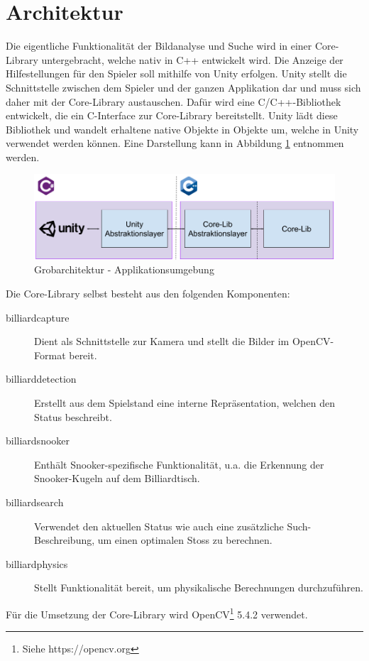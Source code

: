 \section{Architektur}\label{sec:architecture}

Die eigentliche Funktionalität der Bildanalyse und Suche wird in einer Core-Library untergebracht, welche nativ in C++ entwickelt wird.
Die Anzeige der Hilfestellungen für den Spieler soll mithilfe von Unity erfolgen. Unity stellt die Schnittstelle zwischen
dem Spieler und der ganzen Applikation dar und muss sich daher mit der Core-Library austauschen.
Dafür wird eine C/C++-Bibliothek entwickelt, die ein C-Interface zur Core-Library bereitstellt.
Unity lädt diese Bibliothek und wandelt erhaltene native Objekte in Objekte um, welche in Unity verwendet werden können.
Eine Darstellung kann in Abbildung \ref{fig:top-level-architecture} entnommen werden.

\begin{figure}[h!]
    \begin{center}
        \includegraphics[width=0.8\linewidth]{../common/03_billiard_ai/resources/00_top_level_architecture.png}
    \end{center}
    \caption{Grobarchitektur - Applikationsumgebung}
    \label{fig:top-level-architecture}
\end{figure}

Die Core-Library selbst besteht aus den folgenden Komponenten:
\begin{description}
    \item[billiard\textunderscore capture] Dient als Schnittstelle zur Kamera und stellt die Bilder im OpenCV-Format bereit.
    \item[billiard\textunderscore detection] Erstellt aus dem Spielstand eine interne Repräsentation, welchen den Status beschreibt.
    \item[billiard\textunderscore snooker] Enthält Snooker-spezifische Funktionalität, u.a. die Erkennung der Snooker-Kugeln auf dem Billiardtisch.
    \item[billiard\textunderscore search] Verwendet den aktuellen Status wie auch eine zusätzliche Such-Beschreibung, um einen optimalen
    Stoss zu berechnen.
    \item[billiard\textunderscore physics] Stellt Funktionalität bereit, um physikalische Berechnungen durchzuführen.
\end{description}

Für die Umsetzung der Core-Library wird OpenCV\footnote{Siehe https://opencv.org} 5.4.2 verwendet.
